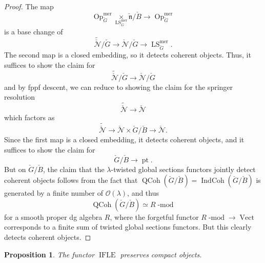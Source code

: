 \documentclass[10pt]{amsart}
\newtheorem{prop}[subsubsection]{Proposition}
\theoremstyle{remark}
\newcommand{\on}[1]{\operatorname{#1}}
\newcommand{\QCoh}{\on{QCoh}}
\newcommand{\IndCoh}{\on{IndCoh}}
\newcommand{\Gcheck}{\check{G}}
\newcommand{\ncheck}{\check{\mathfrak{n}}}
\newcommand{\Bcheck}{\check{B}}
\begin{document}
\begin{proof}
    The map 
    $$
    \on{Op}_{\Gcheck}^{\on{mer}} \underset{\on{LS}_{\Gcheck}^{\on{mer}}}{\times} \ncheck/\Bcheck \longrightarrow \on{Op}_{\Gcheck}^{\on{mer}}
    $$
    is a base change of
    $$
    \tilde{\check{\mathcal{N}}}/\Gcheck \longrightarrow \check{\mathcal{N}}/\Gcheck \longrightarrow \on{LS}_{\Gcheck}^{\on{mer}}.
    $$
    The second map is a closed embedding, so it detects coherent objects. Thus, it suffices to show the claim for 
    $$
    \tilde{\check{\mathcal{N}}}/\Gcheck \longrightarrow \check{\mathcal{N}}/\Gcheck
    $$
    and by fppf descent, we can reduce to showing the claim for the springer resolution
    $$
    \tilde{\check{\mathcal{N}}} \longrightarrow \check{\mathcal{N}}
    $$
    which factors as
    $$
    \tilde{\check{\mathcal{N}}} \longrightarrow \check{\mathcal{N}} \times \Gcheck/\Bcheck \longrightarrow \check{\mathcal{N}}.
    $$
    Since the first map is a closed embedding, it detects coherent objects, and it suffices to show the claim for
    $$
    \Gcheck/\Bcheck \longrightarrow \on{pt}.
    $$
    But on $\Gcheck/\Bcheck$, the claim that the $\lambda$-twisted global sections functors jointly detect coherent objects follows from the fact that $\QCoh(\Gcheck/\Bcheck) = \IndCoh(\Gcheck/\Bcheck)$ is generated by a finite number of $\mathcal{O}(\lambda)$, and thus
    $$
    \QCoh(\Gcheck/\Bcheck) \simeq R\on{-mod}
    $$
    for a smooth proper dg algebra $R$, where the forgetful functor $R\on{-mod} \to \on{Vect}$ corresponds to a finite sum of twisted global sections functors. But this clearly detects coherent objects.
\end{proof}

\begin{prop}
The functor $\on{IFLE}$ preserves compact objects.
\end{prop}
\end{document}
